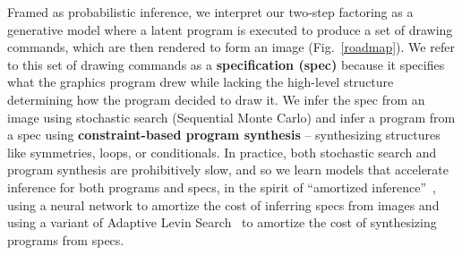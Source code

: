 \documentclass{article}
\theoremstyle{definition}
\begin{document}
 Framed as probabilistic inference,
we interpret our two-step factoring  as a generative model where a latent program
 is executed to produce a set of drawing commands,
 which are then rendered to form an image (Fig.~\ref{roadmap}).
 We refer to this set of drawing commands as a \textbf{specification (spec)} because it specifies what the graphics program drew while lacking the high-level structure determining how the program decided to draw it.
 We infer the spec from an image using stochastic search (Sequential Monte Carlo)
 and infer a program from a spec using  \textbf{constraint-based program synthesis} \citep{solar2008program} --
 synthesizing structures like symmetries, loops, or conditionals.
 In practice, both stochastic search and program synthesis are
 prohibitively slow,
 and so we learn models that accelerate inference for both programs and specs,
 in the spirit of ``amortized inference''~\cite{paige2016inference},
 using a neural network to amortize the cost of inferring specs from images and using
 a variant of Adaptive Levin Search~\cite{schmidhuber1997shifting}
 to amortize the cost of synthesizing programs from specs.
\end{document}
